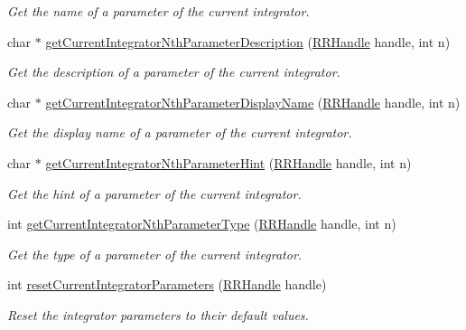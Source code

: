 \begin{DoxyCompactItemize}
\begin{DoxyCompactList}\small\item\em Get the name of a parameter of the current integrator. \end{DoxyCompactList}\item 
char $\ast$ \hyperlink{group__simopts_ga2e525f711d43789ec1170f043f86f127}{get\+Current\+Integrator\+Nth\+Parameter\+Description} (\hyperlink{rrc__types_8h_a1d68f0592372208fa5a5f2799ea4b3ae}{R\+R\+Handle} handle, int n)
\begin{DoxyCompactList}\small\item\em Get the description of a parameter of the current integrator. \end{DoxyCompactList}\item 
char $\ast$ \hyperlink{group__simopts_gae27a074293fc7bde4fcb09720bfdfb85}{get\+Current\+Integrator\+Nth\+Parameter\+Display\+Name} (\hyperlink{rrc__types_8h_a1d68f0592372208fa5a5f2799ea4b3ae}{R\+R\+Handle} handle, int n)
\begin{DoxyCompactList}\small\item\em Get the display name of a parameter of the current integrator. \end{DoxyCompactList}\item 
char $\ast$ \hyperlink{group__simopts_gafa723d0091d673126b4330ec9d6dca11}{get\+Current\+Integrator\+Nth\+Parameter\+Hint} (\hyperlink{rrc__types_8h_a1d68f0592372208fa5a5f2799ea4b3ae}{R\+R\+Handle} handle, int n)
\begin{DoxyCompactList}\small\item\em Get the hint of a parameter of the current integrator. \end{DoxyCompactList}\item 
int \hyperlink{group__simopts_ga0d54a5567d45d3f0547fecbaeae86dd7}{get\+Current\+Integrator\+Nth\+Parameter\+Type} (\hyperlink{rrc__types_8h_a1d68f0592372208fa5a5f2799ea4b3ae}{R\+R\+Handle} handle, int n)
\begin{DoxyCompactList}\small\item\em Get the type of a parameter of the current integrator. \end{DoxyCompactList}\item 
int \hyperlink{group__simopts_gaefa42b6e122d13988bde99fcf6e050d6}{reset\+Current\+Integrator\+Parameters} (\hyperlink{rrc__types_8h_a1d68f0592372208fa5a5f2799ea4b3ae}{R\+R\+Handle} handle)
\begin{DoxyCompactList}\small\item\em Reset the integrator parameters to their default values. \end{DoxyCompactList}\item 

\end{DoxyCompactItemize}
